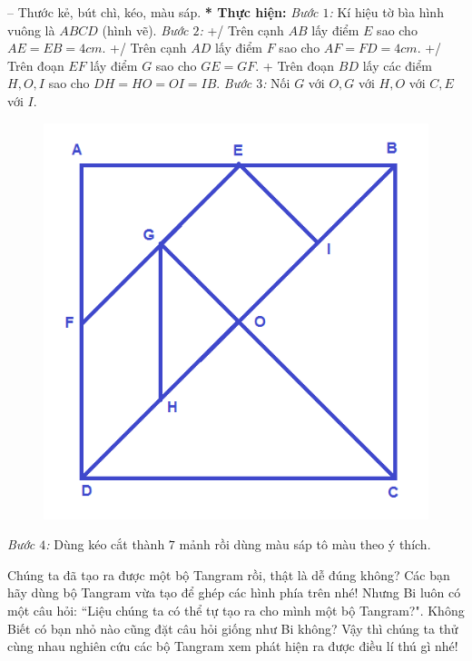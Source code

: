 \begin{multicols}{2}
	\vskip 0.1cm
	-- Thước kẻ, bút chì, kéo, màu sáp.
	\vskip 0.1cm
	\textbf{\color{toancuabi}* Thực hiện:}
	\vskip 0.1cm
	\textit{Bước $1$:} Kí hiệu tờ bìa hình vuông là $ABCD$ (hình vẽ).
	\vskip 0.1cm
	\textit{Bước $2$:} 
	\vskip0.05cm
	+/ Trên cạnh $AB$ lấy điểm $E$ sao cho $AE = EB = 4cm$.
	\vskip 0.1cm
	+/ Trên cạnh $AD$ lấy điểm $F$ sao cho $AF = FD = 4cm$.
	\vskip 0.1cm
	+/ Trên đoạn $EF$ lấy điểm $G$ sao cho $GE= GF$.
	\vskip 0.1cm
	+ Trên đoạn $BD$ lấy các điểm $H, O, I$ sao cho $DH = HO = OI = IB$.
	\vskip 0.1cm
	\textit{Bước $3$:} Nối $G$ với $O, G$ với $H, O$ với $C, E$ với $I$.
	\begin{figure}[H]
		\vspace*{-10pt}
		\centering
		\includegraphics[scale=0.2]{image9}
		\vspace*{-10pt}
	\end{figure}
	\textit{Bước $4$:} Dùng kéo cắt thành $7$ mảnh rồi dùng màu sáp tô màu theo ý thích.
	\end{multicols}
	Chúng ta đã tạo ra được một bộ Tangram rồi, thật là dễ đúng không? Các bạn hãy dùng bộ Tangram vừa tạo để ghép các hình phía trên nhé!
	\vskip 0.1cm
	Nhưng Bi luôn có một câu hỏi: ``Liệu chúng ta có thể tự tạo ra cho mình một bộ Tangram?". Không Biết có bạn nhỏ nào cũng đặt câu hỏi giống như Bi không?
	\vskip 0.1cm
	Vậy thì chúng ta thử cùng nhau nghiên cứu các bộ Tangram xem phát hiện ra được điều lí thú gì nhé!
